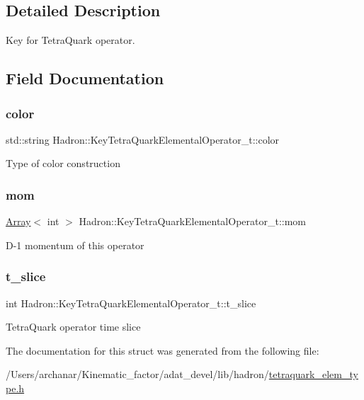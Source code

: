 \subsection{Detailed Description}
Key for Tetra\+Quark operator. 

\subsection{Field Documentation}
\mbox{\label{structHadron_1_1KeyTetraQuarkElementalOperator__t_aeb7ad2a91c69b04ed9b3b37d20be1ffe}} 
\subsubsection{\texorpdfstring{color}{color}}
{\footnotesize\ttfamily std\+::string Hadron\+::\+Key\+Tetra\+Quark\+Elemental\+Operator\+\_\+t\+::color}

Type of color construction \mbox{\label{structHadron_1_1KeyTetraQuarkElementalOperator__t_a722fb3cb3ff844a07f67d0fc0d5e507d}} 
\subsubsection{\texorpdfstring{mom}{mom}}
{\footnotesize\ttfamily \mbox{\hyperlink{classXMLArray_1_1Array}{Array}}$<$ int $>$ Hadron\+::\+Key\+Tetra\+Quark\+Elemental\+Operator\+\_\+t\+::mom}

D-\/1 momentum of this operator \mbox{\label{structHadron_1_1KeyTetraQuarkElementalOperator__t_a3375660f000fa53b1c942e36e8f43cb8}} 
\subsubsection{\texorpdfstring{t\_slice}{t\_slice}}
{\footnotesize\ttfamily int Hadron\+::\+Key\+Tetra\+Quark\+Elemental\+Operator\+\_\+t\+::t\+\_\+slice}

Tetra\+Quark operator time slice 

The documentation for this struct was generated from the following file\+:\begin{DoxyCompactItemize}
\item 
/\+Users/archanar/\+Kinematic\+\_\+factor/adat\+\_\+devel/lib/hadron/\mbox{\hyperlink{lib_2hadron_2tetraquark__elem__type_8h}{tetraquark\+\_\+elem\+\_\+type.\+h}}\end{DoxyCompactItemize}
